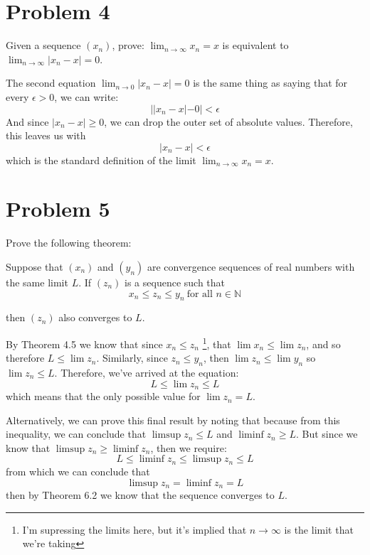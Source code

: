 \documentclass[10pt]{article}
\begin{document}
    \pagebreak
    \section*{Problem 4}
    Given a sequence $(x_n)$, prove: $\lim_{n \to \infty} x_n = x$ is equivalent to $\lim_{n \to \infty} |x_n - x| = 0$.

    \begin{solution}
        The second equation $\lim_{n \to 0} |x_n - x| = 0$ is the same thing as saying that for every $\epsilon > 0$, we can write:
        \[ ||x_n - x| - 0| < \epsilon\]
        And since $|x_n - x| \ge 0$, we can drop the outer set of absolute values. Therefore, this leaves us with
        \[ |x_n - x| < \epsilon\]
        which is the standard definition of the limit $\lim_{n \to \infty} x_n = x$.
    \end{solution}

    \newpage

    \section*{Problem 5}

    Prove the following theorem:

    \begin{theorem}
        Suppose that $(x_n)$ and $(y_n)$ are convergence sequences of real numbers with the same limit $L$. If $(z_n)$ is a sequence such that 
        \[ x_n \le z_n \le y_n \ \text{for all $n \in \mathbb N$}\] 

        then $(z_n)$ also converges to $L$.
    \end{theorem}

    \begin{solution}
        By Theorem 4.5 we know that since $x_n \le z_n$ \footnote{I'm supressing the limits here, but it's implied that $n \to \infty$ is the limit that we're taking}, that $\lim x_n \le \lim z_n$, and so therefore $L \le \lim z_n$. Similarly, since $z_n \le y_n$, then $\lim z_n \le \lim y_n$ so $\lim z_n \le L$. Therefore, we've arrived at the equation:
        \[ L \le \lim z_n \le L\]
        which means that the only possible value for $\lim z_n = L$.

        Alternatively, we can prove this final result by noting that because from this inequality, we can conclude that $\limsup z_n \le L$ and $\liminf z_n \ge L$. But since we know that $\limsup z_n \ge \liminf z_n$, then we require:
        \[ L \le \liminf z_n \le \limsup z_n \le L\]
        from which we can conclude that 
        \[ \limsup z_n = \liminf z_n = L\] 
        then by Theorem 6.2 we know that the sequence converges to $L$.
    \end{solution}
\end{document}
